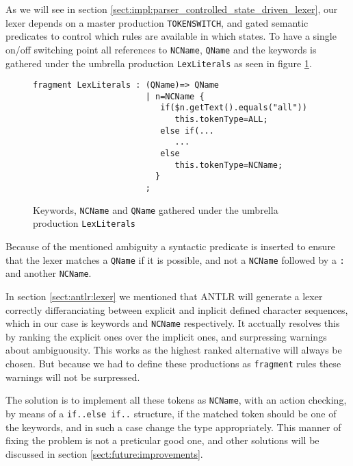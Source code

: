 As we will see in section \ref{sect:impl:parser_controlled_state_driven_lexer}, our lexer depends on a master production \verb!TOKENSWITCH!, and gated semantic predicates to control which rules are available in which states. To have a single on/off switching point all references to \verb!NCName!, \verb!QName! and the keywords is gathered under the umbrella production \verb!LexLiterals! as seen in figure \ref{fig:lexLitterals}.

\begin{figure}[h!]
\begin{verbatim}
fragment LexLiterals : (QName)=> QName
                       | n=NCName {
                          if($n.getText().equals("all")) 
                             this.tokenType=ALL;
                          else if(...
                             ...
                          else 
                             this.tokenType=NCName;
                         }
                       ;
\end{verbatim}
\caption[Keywords, \texttt{NCName} and \texttt{QName} gathered under \texttt{LexLiterals}]{Keywords, \texttt{NCName} and \texttt{QName} gathered under the umbrella production \texttt{LexLiterals}}
\label{fig:lexLitterals}
\end{figure}

Because of the mentioned ambiguity a syntactic predicate is inserted to ensure that the lexer matches a \verb!QName! if it is possible, and not a \verb!NCName! followed by a \verb!:! and another \verb!NCName!.

In section \ref{sect:antlr:lexer} we mentioned that ANTLR will generate a lexer correctly differanciating between explicit and inplicit defined character sequences, which in our case is keywords and \verb!NCName! respectively. It acctually resolves this by ranking the explicit ones over the implicit ones, and surpressing warnings about ambiguousity. This works as the highest ranked alternative will always be chosen. But because we had to define these productions as \verb!fragment! rules these warnings will not be surpressed.

The solution is to implement all these tokens as \verb!NCName!, with an action checking, by means of a \verb!if..else if..! structure, if the matched token should be one of the keywords, and in such a case change the type appropriately. This manner of fixing the problem is not a preticular good one, and other solutions will be discussed in section \ref{sect:future:improvements}.
